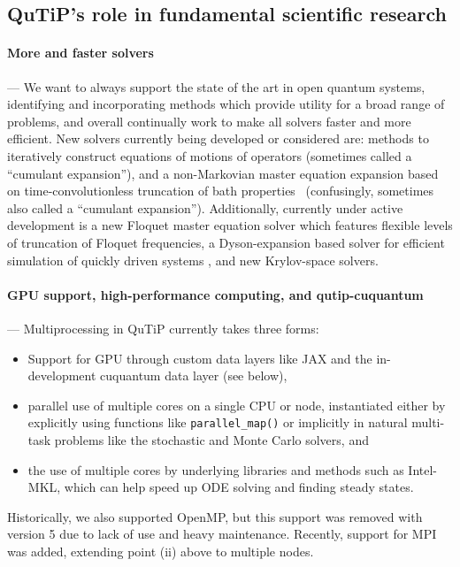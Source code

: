 \documentclass[preprint,3p,sort&compress]{elsarticle}
\def\code#1{\texttt{#1}}
\begin{document}
\subsection{QuTiP's role in fundamental scientific research}
\paragraph{More and faster solvers} --- We want to always support the state of the art in open quantum systems, identifying and incorporating methods which provide utility for a broad range of problems, and overall continually work to make all solvers faster and more efficient.  New solvers currently being developed or considered are: methods to iteratively construct equations of motions of operators  (sometimes called a ``cumulant expansion''), and a non-Markovian master equation expansion based on time-convolutionless truncation of bath properties~\cite{GroszkowskiQuantum2023} (confusingly, sometimes also called a ``cumulant expansion'').  Additionally, currently under active development is a new Floquet master equation solver which features flexible levels of truncation of Floquet frequencies, a Dyson-expansion based solver for efficient simulation of quickly driven systems  \cite{dysolve}, and new Krylov-space solvers.

\paragraph{GPU support, high-performance computing, and qutip-cuquantum} --- Multiprocessing in QuTiP currently takes three forms:  
\begin{itemize} 
\item Support for GPU through custom data layers like JAX and the in-development cuquantum data layer (see below), 
\item parallel use of multiple cores on a single CPU or node, instantiated either by explicitly using functions like \code{parallel\_map()} or implicitly in natural multi-task problems like the stochastic and Monte Carlo solvers, and 
\item the use of multiple cores by underlying libraries and methods such as Intel-MKL, which can help speed up ODE solving and finding steady states. 
\end{itemize}
Historically, we also supported OpenMP, but this support was removed with version 5 due to lack of use and heavy maintenance.  Recently, support for MPI was added, extending point (ii) above to multiple nodes. 
\end{document}
